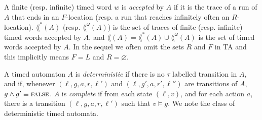 \documentclass[letterpaper,10pt,conference]{ieeeconf}  \IEEEoverridecommandlockouts                              \overrideIEEEmargins
\def\emptyset{\varnothing}
\def\tauac{\tau}
\newcommand{\dur}{{\textit{Dur}}} \def\inv{\textit{Inv}}
\def\false{\mbox{\textsc{false}}}
\begin{document}
A finite (resp. infinite) timed word $w$ is \emph{accepted} by $A$ if
it is the trace of a run of $A$ that ends in an $F$-location (resp. a
run that reaches infinitely often an $R$-location).  $\lang^*(A)$
(resp. $\lang^\omega(A)$) is the set of traces of finite
(resp. infinite) timed words accepted by $A$, and $\lang(A)=\lang^*(A)
\cup \lang^\omega(A)$ is the set of timed words accepted by $A$.
In the sequel we often omit the sets $R$ and $F$ in TA and this
implicitly means $F=L$ and $R=\emptyset$.

A timed automaton $A$ is \emph{deterministic} if there is no $\tauac$
labelled transition in $A$, and if, whenever $(\ell,g,a,r,\ell')$ and
$(\ell,g',a,r',\ell'')$ are transitions of $A$, $g \wedge g' \equiv
\false$.  $A$ is \emph{complete} if from each state $(\ell,v)$, and
for each action $a$, there is a transition $(\ell,g,a,r,\ell')$ such
that $v \models g$.  We note \dta the class of deterministic timed
automata.


\iffalse
\medskip

A finite automaton (FA) is a particular TA with $X=\emptyset$.
Consequently guards and invariants are vacuously true and time
elapsing transitions do not exist.  We write $A=(L,$
$l_0,\Sigma_\tauac,E,F,R)$ for a FA.  A run is thus a
sequence of the form:
\begin{eqnarray*}
  \varrho & = & \ell_0 
  \xrightarrow{a_0} \ell_1 \cdots   \cdots \xrightarrow{a_{n-1}} \ell_n
  \cdots 
\end{eqnarray*}
where for each $i \geq 0$, $(\ell_i,a_i,\ell_{i+1}) \in E$.
Definitions of traces and languages are straightforward.  In this
case, the duration of a run $\varrho$ is the number of steps
(including $\tauac$-steps) of $\varrho$: if $\varrho$ is finite and
ends in $\ell_n$, $\dur(\varrho)=n$ and otherwise
$\dur(\varrho)=\infty$.
\fi
\end{document}
